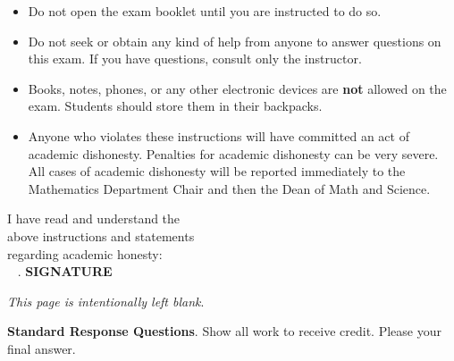 \documentclass[addpoints,14pt,answers]{exam}
\begin{document}
{\begin{minipage}{6.3in}
\begin{itemize}
		\item Do not open the exam booklet until you are instructed to do so.
		\item Do not seek or obtain any kind of help from anyone to answer questions on this exam. If you have questions, consult only the instructor.
		\item Books, notes, phones, or any other electronic devices are \textbf{not} allowed on the exam. Students should store them in their backpacks.
		\item Anyone who violates these instructions will have committed an act of academic dishonesty.
		Penalties for academic dishonesty can be very severe. All cases of academic dishonesty will be reported immediately to the Mathematics Department Chair and then the Dean of Math and Science.
	\end{itemize}
\end{minipage}

\vspace{1cm}

\noindent I have read and understand the\\ above instructions and statements\\ regarding academic honesty:  \, \, \hrulefill\\
\ {\color{white} .} \hspace{11 cm} \textbf{{\footnotesize SIGNATURE}}}


\vfill
\changefontsize{14pt}

\newpage
\phantom{.}
\vfill
\begin{center}
   \textit{This page is intentionally left blank}.
\end{center}
\vfill

\newpage

\changefontsize{14pt}

\begin{tcolorbox}[colback=gray!15,colframe=black]
		{\textbf{Standard Response Questions}. Show all work to receive credit. Please  your final answer. }
\end{tcolorbox}



\vspace{-.5cm}


\end{document}
